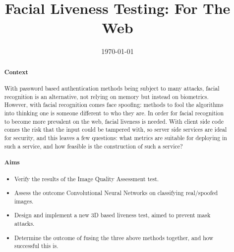\documentclass[10pt,a4paper]{article}
\title{Facial Liveness Testing: For The Web}
\author{} %
\date{\today}
\begin{document}
\maketitle

\begin{abstract}

\paragraph{Context}
    With password based authentication methods being subject to many attacks, facial recognition is an alternative, not relying on memory but instead
    on biometrics. However, with facial recognition comes face spoofing: methods to fool the algorithms into thinking one is someone different to who they are.
    In order for facial recognition to become more prevalent on the web, facial liveness is needed. With client side code comes the risk that the input could be tampered with,
    so server side services are ideal for security, and this leaves a few questions: what metrics are suitable for deploying in such a service, and how feasible is the construction of such a service?

\paragraph{Aims}
    \begin{itemize}
        \item Verify the results of the Image Quality Assessment test.
        \item Assess the outcome Convolutional Neural Networks on classifying real/spoofed images.
        \item Design and implement a new 3D based liveness test, aimed to prevent mask attacks.
        \item Determine the outcome of fusing the three above methods together, and how successful this is.
    \end{itemize}


\end{abstract}
\end{document}
